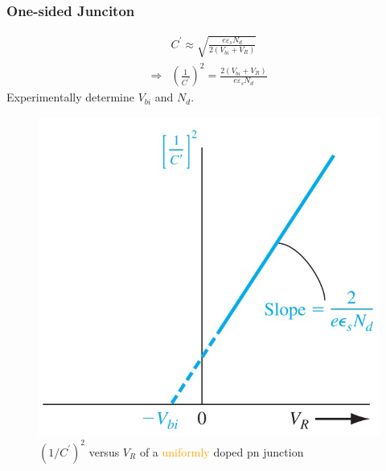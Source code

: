 \documentclass{beamer}
\begin{document}
    \begin{frame} \frametitle{One-sided Junciton}
        \begin{minipage}{\linewidth}
            \begin{minipage}{0.5\linewidth}
                \begin{equation*}
                    \begin{aligned}
                        & C^\prime \approx \sqrt{\frac{e \varepsilon_s N_d}{2 (V_{bi} + V_R)} } \\
                        \Rightarrow & \boxed{\left( \frac{1}{C^\prime}  \right)^2 = \frac{2(V_{bi} + V_R)}{e \varepsilon_s N_d} }
                    \end{aligned}
                \end{equation*}
                Experimentally determine $V_{bi}$ and $N_d$.
            \end{minipage}
            \hspace{2em}
            \begin{minipage}{0.4\linewidth}
                \begin{figure}[H]
                    \centering
                    \includegraphics[width=\linewidth]{C-versus-VR.jpg}
                    \caption{$(1/C^\prime)^2$ versus $V_R$ of a \textcolor{orange}{uniformly} doped pn junction}
                    \label{fig:C-versus-VR.jpg}
                \end{figure}
            \end{minipage}
        \end{minipage}
    \end{frame}
\end{document}
